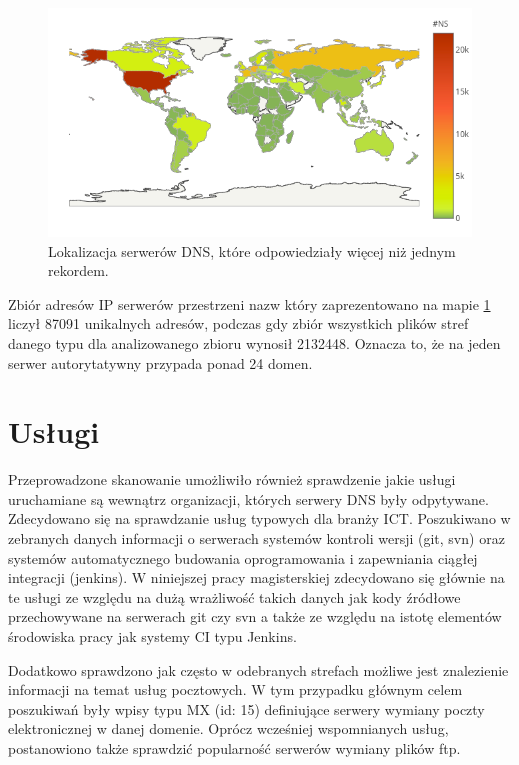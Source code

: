 \begin{figure}[h]
\centering
\includegraphics[width=1.0\textwidth]{image/many_lines_map_no_title}
\caption{Lokalizacja serwerów DNS, które odpowiedziały więcej niż jednym rekordem.}
\label{fig:many_lines_map}
\end{figure}

Zbiór adresów IP serwerów przestrzeni nazw który zaprezentowano na mapie \ref{fig:many_lines_map} liczył 87091 unikalnych adresów, podczas
gdy zbiór wszystkich plików stref danego typu dla analizowanego zbioru wynosił 2132448. Oznacza to, że na jeden serwer autorytatywny
przypada ponad 24 domen.

\section{Usługi}
Przeprowadzone skanowanie umożliwiło również sprawdzenie jakie usługi uruchamiane są wewnątrz organizacji, których serwery DNS
były odpytywane. Zdecydowano się na sprawdzanie usług typowych dla branży ICT. Poszukiwano w zebranych danych informacji o serwerach
systemów kontroli wersji (git, svn) oraz systemów automatycznego budowania oprogramowania i zapewniania ciągłej integracji (jenkins).
W niniejszej pracy magisterskiej zdecydowano się głównie na te usługi ze względu na dużą wrażliwość takich danych jak kody źródłowe
przechowywane na serwerach git czy svn a także ze względu na istotę elementów środowiska pracy jak systemy CI typu Jenkins.

Dodatkowo sprawdzono jak często w odebranych strefach możliwe jest znalezienie informacji na temat usług pocztowych. W tym przypadku
głównym celem poszukiwań były wpisy typu MX (id: 15) definiujące serwery wymiany poczty elektronicznej w danej domenie. Oprócz
wcześniej wspomnianych usług, postanowiono także sprawdzić popularność serwerów wymiany plików ftp.

